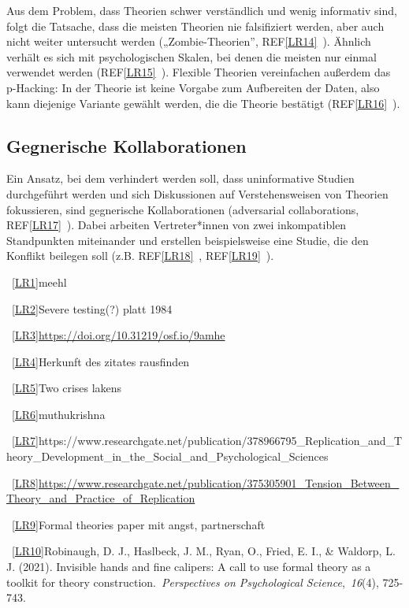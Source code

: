 \documentclass[
  letterpaper,
  DIV=11,
  numbers=noendperiod]{scrreprt}
\begin{document}
Aus dem Problem, dass Theorien schwer verständlich und wenig informativ
sind, folgt die Tatsache, dass die meisten Theorien nie falsifiziert
werden, aber auch nicht weiter untersucht werden („Zombie-Theorien'',
REF\hyperref[_msocom_14]{{[}LR14{]}}~). Ähnlich verhält es sich mit
psychologischen Skalen, bei denen die meisten nur einmal verwendet
werden (REF\hyperref[_msocom_15]{{[}LR15{]}}~). Flexible Theorien
vereinfachen außerdem das p-Hacking: In der Theorie ist keine Vorgabe
zum Aufbereiten der Daten, also kann diejenige Variante gewählt werden,
die die Theorie bestätigt (REF\hyperref[_msocom_16]{{[}LR16{]}}~).

\subsection{Gegnerische
Kollaborationen}\label{gegnerische-kollaborationen}

Ein Ansatz, bei dem verhindert werden soll, dass uninformative Studien
durchgeführt werden und sich Diskussionen auf Verstehensweisen von
Theorien fokussieren, sind gegnerische Kollaborationen (adversarial
collaborations, REF\hyperref[_msocom_17]{{[}LR17{]}}~). Dabei arbeiten
Vertreter*innen von zwei inkompatiblen Standpunkten miteinander und
erstellen beispielsweise eine Studie, die den Konflikt beilegen soll
(z.B. REF\hyperref[_msocom_18]{{[}LR18{]}}~,
REF\hyperref[_msocom_19]{{[}LR19{]}}~).

~\hyperref[_msoanchor_1]{{[}LR1{]}}meehl

~\hyperref[_msoanchor_2]{{[}LR2{]}}Severe testing(?) platt 1984

~\hyperref[_msoanchor_3]{{[}LR3{]}}\url{https://doi.org/10.31219/osf.io/9amhe}

~\hyperref[_msoanchor_4]{{[}LR4{]}}Herkunft des zitates rausfinden

~\hyperref[_msoanchor_5]{{[}LR5{]}}Two crises lakens

~\hyperref[_msoanchor_6]{{[}LR6{]}}muthukrishna

~\hyperref[_msoanchor_7]{{[}LR7{]}}https://www.researchgate.net/publication/378966795\_Replication\_and\_Theory\_Development\_in\_the\_Social\_and\_Psychological\_Sciences

~\hyperref[_msoanchor_8]{{[}LR8{]}}\url{https://www.researchgate.net/publication/375305901_Tension_Between_Theory_and_Practice_of_Replication}

~\hyperref[_msoanchor_9]{{[}LR9{]}}Formal theories paper mit angst,
partnerschaft

~\hyperref[_msoanchor_10]{{[}LR10{]}}Robinaugh, D. J., Haslbeck, J. M.,
Ryan, O., Fried, E. I., \& Waldorp, L. J. (2021). Invisible hands and
fine calipers: A call to use formal theory as a toolkit for theory
construction.~\emph{Perspectives on Psychological
Science},~\emph{16}(4), 725-743.
\end{document}
